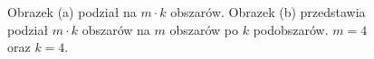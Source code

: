 \begin{figure}[h]
\centering
\begin{subfigure}{.5\textwidth}
    \centering
    \caption[short]{}
\end{subfigure}%
\begin{subfigure}{.5\textwidth}
    \centering
    \caption[short]{}
\end{subfigure}
\caption{Obrazek (a) podział na $m \cdot k$ obszarów. Obrazek (b) przedstawia podział $m \cdot k$ obszarów na $m$ obszarów
po $k$ podobszarów. $m=4$ oraz $k=4$.}
\label{im:k_m2}
\end{figure}